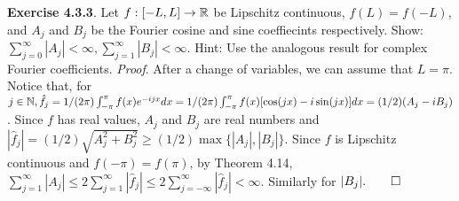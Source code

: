 {\bf Exercise 4.3.3}. Let $f: [-L,L] \rightarrow \mathbb{R}$ be Lipschitz continuous, $f(L)=f(-L)$, and $A_j$ and $B_j$ be the Fourier cosine and sine coeffiecints respectively. Show: $\sum_{j=0}^{\infty}|A_j|<\infty, \sum_{j=1}^{\infty}|B_j|<\infty$. Hint: Use the analogous result for complex Fourier coefficients. {\it Proof}. After a change of variables, we can assume that $L=\pi$. Notice that, for $j\in \mathbb{N}, \hat{f}_j=1/(2\pi)\int_{-\pi}^{\pi}f(x)e^{-ijx}dx= 1/(2\pi)\int_{-\pi}^{\pi}f(x)[\cos(jx)-i\sin(jx)]dx=(1/2)(A_j-iB_j)$. Since $f$ has real values, $A_j$ and $B_j$ are real numbers and $|\hat{f}_j|=(1/2)\sqrt{A_j^2+B_j^2}\geq (1/2)\max\{|A_j|,|B_j|\}$. Since $f$ is Lipschitz continuous and $f(-\pi)=f(\pi)$, by Theorem 4.14, $\sum_{j=1}^{\infty}|A_j| \leq 2 \sum_{j=1}^{\infty}|\hat{f}_j|\leq 2\sum_{j=-\infty}^{\infty}|\hat{f}_j|<\infty$. Similarly for $|B_j|. \qed$